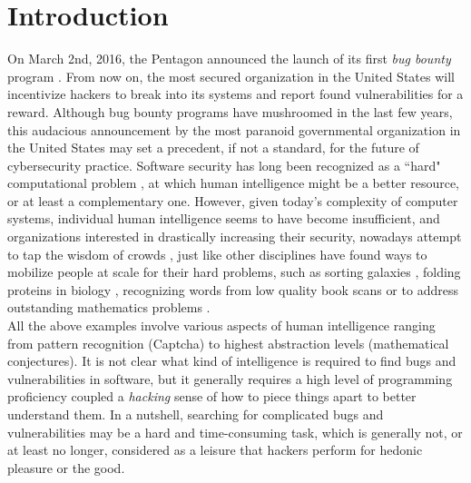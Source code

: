 \section{Introduction}
\label{sec:intro}
On March 2nd, 2016, the Pentagon announced the launch of its first {\it bug bounty} program \cite{Pentagon}. From now on, the most secured organization in the United States will incentivize hackers to break into its systems and report found vulnerabilities for a reward. Although bug bounty programs have mushroomed in the last few years, this audacious announcement by the most paranoid governmental organization in the United States may set a precedent, if not a standard, for the future of cybersecurity practice. Software security has long been recognized as a ``hard" computational problem \cite{adams1984textordfeminineoptimizing}, at which human intelligence might be a better resource, or at least a complementary one. However, given today's complexity of computer systems, individual human intelligence seems to have become insufficient, and organizations interested in drastically increasing their security, nowadays attempt to tap the wisdom of crowds \cite{surowiecki2005wisdom}, just like other disciplines have found ways to mobilize people at scale for their hard problems, such as sorting galaxies \cite{smith2013introduction}, folding proteins in biology \cite{khatib2011algorithm}, recognizing words from low quality book scans \cite{von2003captcha} or to address outstanding mathematics problems \cite{gowers2009massively,cranshaw2011polymath}.\\ 

All the above examples involve various aspects of human intelligence ranging from pattern recognition (Captcha) to highest abstraction levels (mathematical conjectures). It is not clear what kind of intelligence is required to find bugs and vulnerabilities in software, but it generally requires a high level of programming proficiency coupled a {\it hacking} sense of how to piece things apart to better understand them. In a nutshell, searching for complicated  bugs and vulnerabilities may be a hard and time-consuming task, which is generally not, or at least no longer, considered as a leisure that hackers perform for hedonic pleasure or the good.\\

